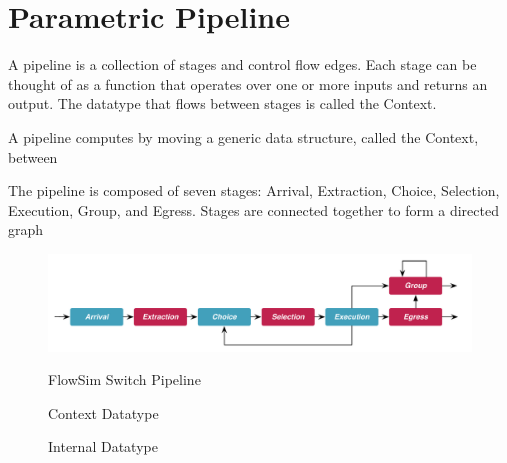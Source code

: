 \section{Parametric Pipeline}

A pipeline is a collection of stages and control flow edges. Each stage can be
thought of as a function that operates over one or more inputs and returns an 
output. The datatype that flows between stages is called the Context.

A pipeline computes
by moving a generic data structure, called the Context, between 

The pipeline is composed of seven stages: Arrival, Extraction, Choice, 
Selection, Execution, Group, and Egress. Stages are connected together to
form a directed graph


\begin{figure}[h]
  \includegraphics[width=\linewidth]{figures/pipeline.pdf}
  \label{figure:pipeline}
  \caption{FlowSim Switch Pipeline}
\end{figure}

\begin{figure}
  
  \label{listing:context}
  \caption{Context Datatype}
\end{figure}

\begin{figure}
  
  \label{listing:internal}
  \caption{Internal Datatype}
\end{figure}
